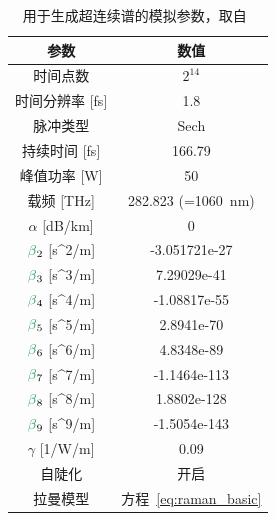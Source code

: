 \begin{table}[]
\centering
\begin{tabular}{cc}
\textbf{参数}                      & \textbf{数值}                                  \\ \hline
时间点数                           & $2^{14}$                                          \\ 
时间分辨率 {[}fs{]}                & 1.8                                             \\ \hline
脉冲类型                              & Sech                                            \\ 
持续时间 {[}fs{]}                       & 166.79                                          \\ 
峰值功率 {[}W{]}                      & 50                                              \\ 
载频 {[}THz{]}                 & 282.823 (=1060~nm)                         \\ \hline
$\alpha$ {[}dB/km{]}                    & 0                                               \\ 
$\betag_2$ {[}s\textasciicircum{}2/m{]} & -3.051721e-27                                   \\ 
$\betag_3$ {[}s\textasciicircum{}3/m{]} & 7.29029e-41                                     \\ 
$\betag_4$ {[}s\textasciicircum{}4/m{]} & -1.08817e-55                                    \\ 
$\betag_5$ {[}s\textasciicircum{}5/m{]} & 2.8941e-70                                      \\ 
$\betag_6$ {[}s\textasciicircum{}6/m{]} & 4.8348e-89                                      \\ 
$\betag_7$ {[}s\textasciicircum{}7/m{]} & -1.1464e-113                                    \\ 
$\betag_8$ {[}s\textasciicircum{}8/m{]} & 1.8802e-128                                     \\ 
$\betag_9$ {[}s\textasciicircum{}9/m{]} & -1.5054e-143                                    \\ 
$\gamma$ {[}1/W/m{]}                    & 0.09                                            \\ 
自陡化                         & 开启                                              \\ 
拉曼模型                             & 方程~\ref{eq:raman_basic}
\end{tabular}
\caption{用于生成超连续谱的模拟参数，取自~\cite{supercontinuum_paper}}
\label{tab:SC_params}
\end{table}

